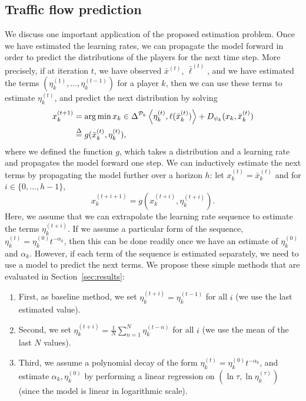 \documentclass{sig-alternate-ipsn13}
\begin{document}
\subsection{Traffic flow prediction}
We discuss one important application of the proposed estimation problem. Once we have estimated the learning rates, we can propagate the model forward in order to predict the distributions of the players for the next time step. More precisely, if at iteration $t$, we have observed $\bar x^{(t)}$, $\bar \ell^{(t)}$, and we have estimated the terms $(\eta_k^{(1)}, \dots, \eta_k^{(t-1)})$ for a player $k$, then we can use these terms to estimate $\eta_k^{(t)}$, and predict the next distribution by solving
\begin{align*}
x_k^{(t+1)}
&= \operatorname*{arg\,min}{x_k \in \Delta^{\mathcal{P}_k}} \left\langle \eta_k^{(t)} ,  \ell(\bar x^{(t)}_k)  \right\rangle + D_{\psi_k}(x_k, \bar x^{(t)}_k) \\
&\overset{\Delta}{=} g(\bar x^{(t)}_k, \eta_k^{(t)}),
\end{align*}
where we defined the function $g$, which takes a distribution and a learning rate and propagates the model forward one step. We can inductively estimate the next terms by propagating the model further over a horizon $h$: let $x_k^{(t)} = \bar x_k^{(t)}$ and for $i \in \{0, \dots, h-1\}$,
\begin{equation}
\label{eq:propagation}
x_k^{(t+i+1)} = g(x^{(t+i)}_k, \eta_k^{(t+i)}).
\end{equation}
Here, we assume that we can extrapolate the learning rate sequence to estimate the terms $\eta_k^{(t+i)}$. If we assume a particular form of the sequence, $\eta_k^{(t)} = \eta_k^{(0)} t^{-\alpha_k}$, then this can be done readily once we have an estimate of $\eta_k^{(0)}$ and $\alpha_k$. However, if each term of the sequence is estimated separately, we need to use a model to predict the next terms. We propose these simple methods that are evaluated in Section~\ref{sec:results}:
\begin{enumerate}[itemsep=-1ex]
\item First, as baseline method, we set $\eta_k^{(t+i)} = \eta^{(t-1)}_k$ for all $i$ (we use the last estimated value).
\item Second, we set $\eta_k^{(t+i)} = \frac{1}{N} \sum_{n = 1}^N \eta^{(t-n)}_k$ for all $i$ (we use the mean of the last $N$ values).
\item Third, we assume a polynomial decay of the form $\eta_k^{(t)} = \eta_k^{(0)} t^{-\alpha_k}$, and estimate $\alpha_k, \eta_k^{(0)}$ by performing a linear regression on $(\ln \tau, \ln \eta_k^{(\tau)})$ (since the model is linear in logarithmic scale).
\end{enumerate}
\end{document}
